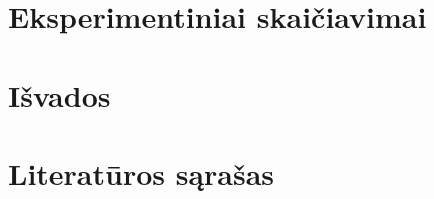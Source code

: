\documentclass{ktu_phd_summary}
\begin{document}
\clearpage

\section{Eksperimentiniai skaičiavimai}


\clearpage

\section{Išvados}


\section*{Literatūros sąrašas}

\begingroup
   \renewcommand{\section}[2]{}%
   
   
\endgroup
\end{document}
